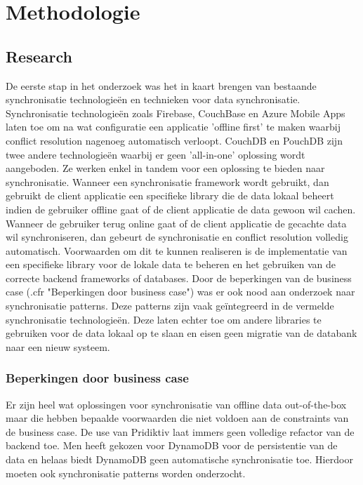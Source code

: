 
\chapter{Methodologie}
\label{ch:methodologie}


\section{Research}
De eerste stap in het onderzoek was het in kaart brengen van bestaande synchronisatie technologie\"en en technieken voor data synchronisatie. Synchronisatie technologie\"en zoals Firebase, CouchBase en Azure Mobile Apps laten toe om na wat configuratie een applicatie 'offline first' te maken waarbij conflict resolution nagenoeg automatisch verloopt. CouchDB en PouchDB zijn twee andere technologie\"en waarbij er geen 'all-in-one' oplossing wordt aangeboden. Ze werken enkel in tandem voor een oplossing te bieden naar synchronisatie. Wanneer een synchronisatie framework wordt gebruikt, dan gebruikt de client applicatie een specifieke library die de data lokaal beheert indien de gebruiker offline gaat of de client applicatie de data gewoon wil cachen. Wanneer de gebruiker terug online gaat of de client applicatie de gecachte data wil synchroniseren, dan gebeurt de synchronisatie en conflict resolution volledig automatisch. Voorwaarden om dit te kunnen realiseren is de implementatie van een specifieke library voor de lokale data te beheren en het gebruiken van de correcte backend frameworks of databases.
Door de beperkingen van de business case (.cfr "Beperkingen door business case") was er ook nood aan onderzoek naar synchronisatie patterns. Deze patterns zijn vaak ge\"integreerd in de vermelde synchronisatie technologie\"en. Deze laten echter toe om andere libraries te gebruiken voor de data lokaal op te slaan en eisen geen migratie van de databank naar een nieuw systeem.
\subsection{Beperkingen door business case}
Er zijn heel wat oplossingen voor synchronisatie van offline data out-of-the-box maar die hebben bepaalde voorwaarden die niet voldoen aan de constraints van de business case. De use van Pridiktiv laat immers geen volledige refactor van de backend toe. Men heeft gekozen voor DynamoDB voor de persistentie van de data en helaas biedt DynamoDB geen automatische synchronisatie toe. Hierdoor moeten ook synchronisatie patterns worden onderzocht.
